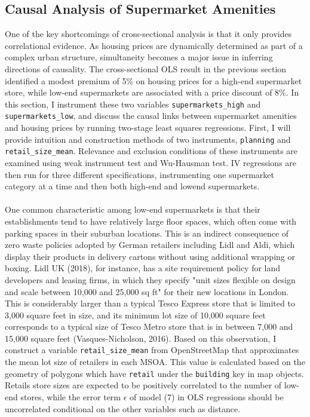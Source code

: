 \documentclass{article}
\begin{document}
\subsection{Causal Analysis of Supermarket Amenities} \label{subsection:iv}
One of the key shortcomings of cross-sectional analysis is that it only provides correlational evidence. As housing prices are dynamically determined as part of a complex urban structure, simultaneity becomes a major issue in inferring directions of causality. The cross-sectional OLS result in the previous section identified a modest premium of 5\% on housing prices for a high-end supermarket store, while low-end supermarkets are associated with a price discount of 8\%. In this section, I instrument these two variables \texttt{supermarkets\_high} and \texttt{supermarkets\_low}, and discuss the causal links between supermarket amenities and housing prices by running two-stage least squares regressions. First, I will provide intuition and construction methods of two instruments, \texttt{planning} and \texttt{retail\_size\_mean}. Relevance and exclusion conditions of these instruments are examined using weak instrument test and Wu-Hausman test. IV regressions are then run for three different specifications, instrumenting one supermarket category at a time and then both high-end and lowend supermarkets.\\\\
One common characteristic among low-end supermarkets is that their establishments tend to have relatively large floor spaces, which often come with parking spaces in their suburban locations. This is an indirect consequence of zero waste policies adopted by German retailers including Lidl and Aldi, which display their products in delivery cartons without using additional wrapping or boxing. Lidl UK (2018), for instance, has a site requirement policy for land developers and leasing firms, in which they specify "unit sizes flexible on design and scale between 10,000 and 25,000 sq ft" for their new locations in London. This is considerably larger than a typical Tesco Express store that is limited to 3,000 square feet in size, and its minimum lot size of 10,000 square feet corresponds to a typical size of Tesco Metro store that is in between 7,000 and 15,000 square feet (Vasques-Nicholson, 2016). Based on this observation, I construct a variable \texttt{retail\_size\_mean} from OpenStreetMap that approximates the mean lot size of retailers in each MSOA. This value is calculated based on the geometry of polygons which have \texttt{retail} under the \texttt{building} key in map objects. Retails store sizes are expected to be positively correlated to the number of low-end stores, while the error term $\epsilon$ of model (7) in OLS regressions should be uncorrelated conditional on the other variables such as distance.
\end{document}
